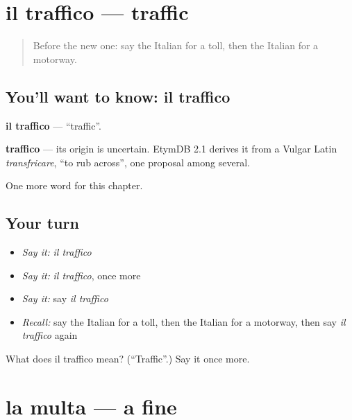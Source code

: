 \section[il traffico]{il traffico — traffic}

\label{lesson:IT-C167-traffico}



\begin{quote}
Before the new one: say the Italian for a toll, then the Italian for a motorway.
\end{quote}

\subsection*{You'll want to know: il traffico}
\textbf{il traffico} — \textquotedblleft{}traffic\textquotedblright{}.

\begin{cousinweb}
\textbf{traffico} — its origin is uncertain. EtymDB 2.1 derives it from a Vulgar Latin \emph{transfricare}, \textquotedblleft{}to rub across\textquotedblright{}, one proposal among several.
\end{cousinweb}

\begin{grammarlens}[title={What you've built}]
One more word for this chapter.
\end{grammarlens}

\subsection*{Your turn}
\begin{itemize}
\raggedright
  \item \emph{Say it:} \emph{il traffico}
  \item \emph{Say it:} \emph{il traffico}, once more
  \item \emph{Say it:} say \emph{il traffico}
  \item \emph{Recall:} say the Italian for a toll, then the Italian for a motorway, then say \emph{il traffico} again
\end{itemize}

\begin{tcolorbox}[breakable,colback=teal!4,colframe=teal!35!black,title={Before you move on}]
What does il traffico mean? (\textquotedblleft{}Traffic\textquotedblright{}.) Say it once more.
\end{tcolorbox}
\section[la multa]{la multa — a fine}

